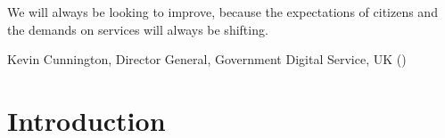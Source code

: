 




\setlength{\epigraphwidth}{0.5\textwidth}
\epigraph{We will always be looking to improve, because the expectations of citizens and the demands on services will always be shifting.}{Kevin Cunnington, Director General, Government Digital Service, UK (\cite*{Cunnington2017})}

\section{Introduction}


